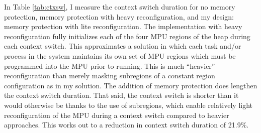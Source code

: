 In Table \ref{tab:ctxsw}, I measure the context switch duration for no memory protection, memory protection with heavy reconfiguration, and my design: memory protection with lite reconfiguration. The implementation with heavy reconfiguration fully initializes each of the four MPU regions of the heap during each context switch. This approximates a solution in which each task and/or process in the system maintains its own set of MPU regions which must be programmed into the MPU prior to running. This is much ``heavier'' reconfiguration than merely masking subregions of a constant region configuration as in my solution. The addition of memory protection does lengthen the context switch duration. That said, the context switch is shorter than it would otherwise be thanks to the use of subregions, which enable relatively light reconfiguration of the MPU during a context switch compared to heavier approaches. This works out to a reduction in context switch duration of 21.9\%.
